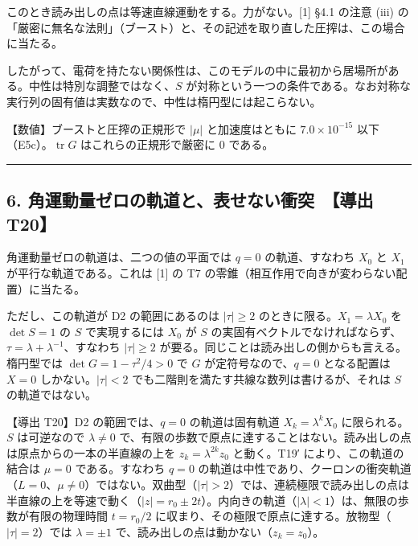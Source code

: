 \documentclass[
  a4paper,
]{ltjsarticle}
\begin{document}
このとき読み出しの点は等速直線運動をする。力がない。{[}1{]} §4.1 の注意
(iii)
の「厳密に無名な法則」（ブースト）と、その記述を取り直した圧搾は、この場合に当たる。

したがって、電荷を持たない関係性は、このモデルの中に最初から居場所がある。中性は特別な調整ではなく、\(S\)
が対称という一つの条件である。なお対称な実行列の固有値は実数なので、中性は楕円型には起こらない。

【数値】ブーストと圧搾の正規形で \(\lvert\mu\rvert\) と加速度はともに
\(7.0\times10^{-15}\) 以下（E5c）。\(\operatorname{tr}G\)
はこれらの正規形で厳密に 0 である。

\begin{center}\rule{0.5\linewidth}{0.5pt}\end{center}

\subsection{6. 角運動量ゼロの軌道と、表せない衝突　【導出
T20】}\label{ux89d2ux904bux52d5ux91cfux30bcux30edux306eux8eccux9053ux3068ux8868ux305bux306aux3044ux885dux7a81-ux5c0eux51fa-t20}

角運動量ゼロの軌道は、二つの値の平面では \(q=0\) の軌道、すなわち
\(X_0\) と \(X_1\) が平行な軌道である。これは {[}1{]} の T7
の零錐（相互作用で向きが変わらない配置）に当たる。

ただし、この軌道が D2 の範囲にあるのは \(\lvert\tau\rvert\ge2\)
のときに限る。\(X_1=\lambda X_0\) を \(\det S=1\) の \(S\)
で実現するには \(X_0\) が \(S\)
の実固有ベクトルでなければならず、\(\tau=\lambda+\lambda^{-1}\)、すなわち
\(\lvert\tau\rvert\ge2\)
が要る。同じことは読み出しの側からも言える。楕円型では
\(\det G=1-\tau^2/4>0\) で \(G\) が定符号なので、\(q=0\) となる配置は
\(X=0\) しかない。\(\lvert\tau\rvert<2\)
でも二階則を満たす共線な数列は書けるが、それは \(S\) の軌道ではない。

【導出 T20】D2 の範囲では、\(q=0\) の軌道は固有軌道 \(X_k=\lambda^kX_0\)
に限られる。\(S\) は可逆なので \(\lambda\neq0\)
で、有限の歩数で原点に達することはない。読み出しの点は原点からの一本の半直線の上を
\(z_k=\lambda^{2k}z_0\) と動く。T19′ により、この軌道の結合は \(\mu=0\)
である。すなわち \(q=0\)
の軌道は中性であり、クーロンの衝突軌道（\(L=0\)、\(\mu\neq0\)）ではない。双曲型（\(\lvert\tau\rvert>2\)）では、連続極限で読み出しの点は半直線の上を等速で動く（\(\lvert z\rvert=r_0\pm2t\)）。内向きの軌道（\(\lvert\lambda\rvert<1\)）は、無限の歩数が有限の物理時間
\(t=r_0/2\)
に収まり、その極限で原点に達する。放物型（\(\lvert\tau\rvert=2\)）では
\(\lambda=\pm1\) で、読み出しの点は動かない（\(z_k=z_0\)）。
\end{document}
